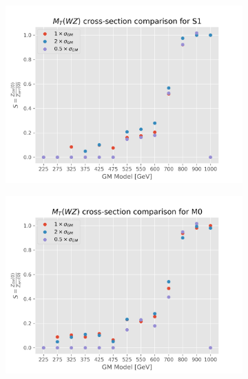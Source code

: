 \documentclass[../Bachelorarbeit.tex]{subfiles}
\begin{document}
\begin{figure}[h]
    \centering
    \begin{subfigure}{0.45\textwidth}
        \includegraphics[width=\textwidth]{Plots/gm_relevanze/MTWZ_comparision_S1.png}
    \end{subfigure}
    \begin{subfigure}{0.45\textwidth}
        \includegraphics[width=\textwidth]{Plots/gm_relevanze/MTWZ_comparision_M0.png}
    \end{subfigure}
    \begin{subfigure}{0.45\textwidth}

\end{subfigure}
\end{figure}
\end{document}
